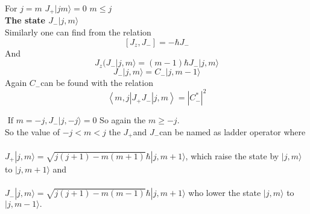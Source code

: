\begin{center}
\end{center}
\hspace{4cm}For $j=m$\hspace{1cm}
 $J_{+}|j  m\rangle=0$\hspace{1cm}
$m \leq j$\\
\textbf{The state $J_{-}|j, m\rangle$}\\
Similarly one can find from the relation
$$\left[ J_z,J_{-}\right] =-\hbar J_{-}$$
And $$J_z( J_{-}|j,m\rangle =(m-1)\hbar J_{-}|j,m\rangle$$ $$J_{-}|j,m\rangle=C_{-}|j,m-1\rangle$$
Again $C_-$can be found with the relation
	$$\left\langle m, j\left|J_{+} J_{-}\right| j, m\right\rangle=\left|C_{-}^{*}\right|^{2} $$
	\begin{center}
	\end{center}
$
\text { If } m=-j, J_{-}|j,-j\rangle=0
$
So again the $m \geq-j$.\\
So the value of $-j<m<j$ the $J_{+}$and $J_{-}$can be named as ladder operator
 where\\\\ $J_{+}|j, m\rangle=\sqrt{j(j+1)-m(m+1)} \hbar|j, m+1\rangle$, which raise the state by $|j, m\rangle$ to $|j, m+1\rangle$ and\\\\
 $J_{-}|j, m\rangle=\sqrt{j(j+1)-m(m-1)} \hbar|j, m+1\rangle$ who lower the state $|j, m\rangle$ to $|j, m-1\rangle .$
